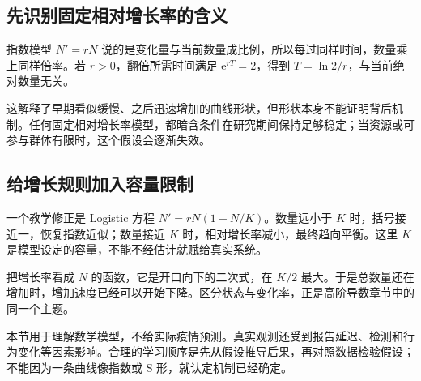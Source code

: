 \subsection*{先识别固定相对增长率的含义}
指数模型 $N'=rN$ 说的是变化量与当前数量成比例，所以每过同样时间，数量乘上同样倍率。若 $r>0$，翻倍所需时间满足 $\mathrm e^{rT}=2$，得到 $T=\ln2/r$，与当前绝对数量无关。

这解释了早期看似缓慢、之后迅速增加的曲线形状，但形状本身不能证明背后机制。任何固定相对增长率模型，都暗含条件在研究期间保持足够稳定；当资源或可参与群体有限时，这个假设会逐渐失效。

\subsection*{给增长规则加入容量限制}
一个教学修正是 Logistic 方程 $N'=rN(1-N/K)$。数量远小于 $K$ 时，括号接近一，恢复指数近似；数量接近 $K$ 时，相对增长率减小，最终趋向平衡。这里 $K$ 是模型设定的容量，不能不经估计就赋给真实系统。

把增长率看成 $N$ 的函数，它是开口向下的二次式，在 $K/2$ 最大。于是总数量还在增加时，增加速度已经可以开始下降。区分状态与变化率，正是高阶导数章节中的同一个主题。

本节用于理解数学模型，不给实际疫情预测。真实观测还受到报告延迟、检测和行为变化等因素影响。合理的学习顺序是先从假设推导后果，再对照数据检验假设；不能因为一条曲线像指数或 S 形，就认定机制已经确定。
